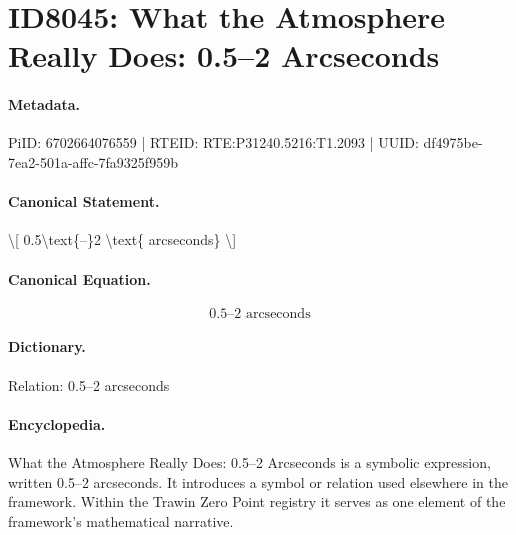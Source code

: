 \section*{ID8045: What the Atmosphere Really Does: 0.5–2 Arcseconds}
\paragraph{Metadata.}
PiID: 6702664076559 | RTEID: RTE:P31240.5216:T1.2093 | UUID: df4975be-7ea2-501a-affc-7fa9325f959b

\paragraph{Canonical Statement.}
\textbackslash{}[ 0.5\textbackslash{}text\{–\}2 \textbackslash{}text\{ arcseconds\} \textbackslash{}]

\paragraph{Canonical Equation.}
\[
0.5\text{–}2 \text{ arcseconds}
\]

\paragraph{Dictionary.}
Relation: 0.5–2 arcseconds

\paragraph{Encyclopedia.}
What the Atmosphere Really Does: 0.5–2 Arcseconds is a symbolic expression, written 0.5–2 arcseconds. It introduces a symbol or relation used elsewhere in the framework. Within the Trawin Zero Point registry it serves as one element of the framework's mathematical narrative.
